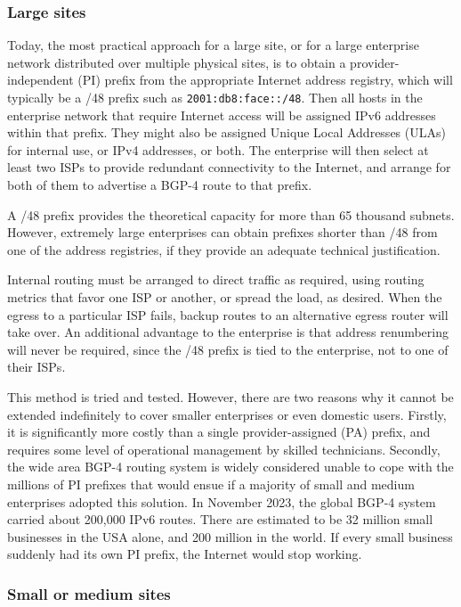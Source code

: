 \documentclass[
]{article}
\begin{document}
\subsubsection{Large sites}\label{large-sites}

Today, the most practical approach for a large site, or for a large
enterprise network distributed over multiple physical sites, is to
obtain a provider-independent (PI) prefix from the appropriate Internet
address registry, which will typically be a /48 prefix such as
\texttt{2001:db8:face::/48}. Then all hosts in the enterprise network
that require Internet access will be assigned IPv6 addresses within that
prefix. They might also be assigned Unique Local Addresses (ULAs) for
internal use, or IPv4 addresses, or both. The enterprise will then
select at least two ISPs to provide redundant connectivity to the
Internet, and arrange for both of them to advertise a BGP-4 route to
that prefix.

A /48 prefix provides the theoretical capacity for more than 65 thousand
subnets. However, extremely large enterprises can obtain prefixes
shorter than /48 from one of the address registries, if they provide an
adequate technical justification.

Internal routing must be arranged to direct traffic as required, using
routing metrics that favor one ISP or another, or spread the load, as
desired. When the egress to a particular ISP fails, backup routes to an
alternative egress router will take over. An additional advantage to the
enterprise is that address renumbering will never be required, since the
/48 prefix is tied to the enterprise, not to one of their ISPs.

This method is tried and tested. However, there are two reasons why it
cannot be extended indefinitely to cover smaller enterprises or even
domestic users. Firstly, it is significantly more costly than a single
provider-assigned (PA) prefix, and requires some level of operational
management by skilled technicians. Secondly, the wide area BGP-4 routing
system is widely considered unable to cope with the millions of PI
prefixes that would ensue if a majority of small and medium enterprises
adopted this solution. In November 2023, the global BGP-4 system carried
about 200,000 IPv6 routes. There are estimated to be 32 million small
businesses in the USA alone, and 200 million in the world. If every
small business suddenly had its own PI prefix, the Internet would stop
working.

\subsubsection{Small or medium sites}\label{small-or-medium-sites}
\end{document}
